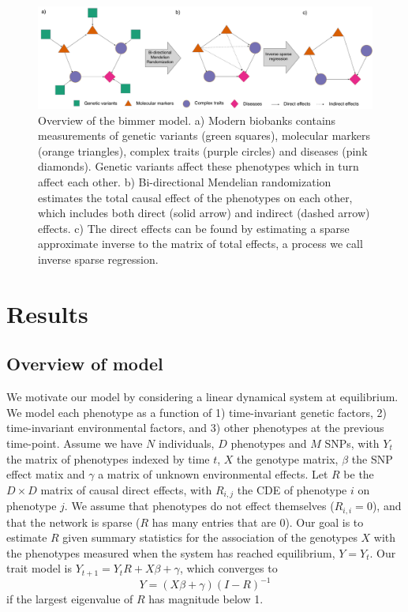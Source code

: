 \documentclass{article}
\begin{document}
\begin{figure}\label{figure0}
\includegraphics[width=\textwidth]{figures/bimmer_figure1.pdf}
\caption{Overview of the bimmer model. a) Modern biobanks contains measurements of genetic variants (green squares), molecular markers
(orange triangles), complex traits (purple circles) and diseases (pink diamonds). Genetic variants
affect these phenotypes which in turn affect each other. b) Bi-directional Mendelian randomization
estimates the total causal effect of the phenotypes on each other, which includes both
direct (solid arrow) and indirect (dashed arrow) effects. c) The direct effects can be
found by estimating a sparse approximate inverse to the matrix of total effects, a process we
call inverse sparse regression.}
\end{figure}

\section{Results}
\subsection*{Overview of model}

We motivate our model by considering a linear dynamical system at equilibrium.
We model each phenotype as a function of 1) time-invariant genetic factors, 2)
time-invariant environmental factors, and 3) other phenotypes at the previous
time-point.
Assume we have $N$ individuals, $D$ phenotypes and $M$ SNPs,
with $Y_t$ the matrix of phenotypes indexed by time $t$, $X$ the genotype
matrix, $\beta$ the SNP effect matix and $\gamma$ a matrix of unknown
environmental effects. Let $R$ be the $D \times D$ matrix of
causal direct effects, with $R_{i, j}$ the CDE of phenotype $i$ on
phenotype $j$. We assume that phenotypes do not effect themselves ($R_{i,i} = 0$),
and that the network is sparse ($R$ has many entries that are $0$).
Our goal is to estimate $R$ given summary statistics
 for the association of the genotypes $X$ with the phenotypes measured when
 the system has reached equilibrium, $Y = Y_{t}$.
 Our trait model is $Y_{t+1} = Y_{t} R + X\beta + \gamma$, which converges to
\begin{equation}\label{model}
Y = (X\beta + \gamma)(I-R)^{-1}
\end{equation}
if the largest eigenvalue of $R$ has magnitude below 1.
\end{document}
